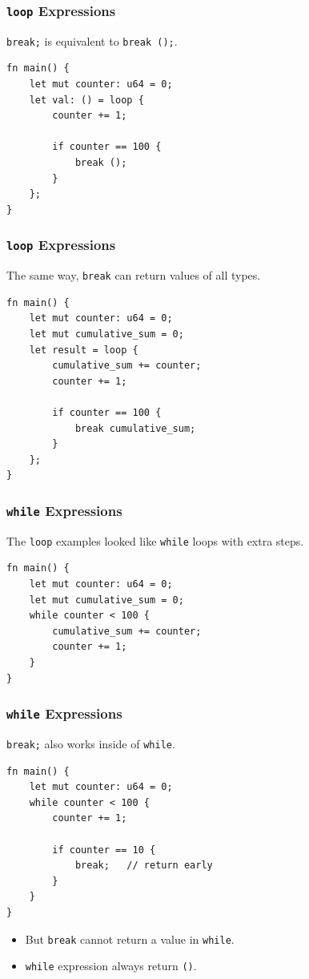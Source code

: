 \begin{frame}[fragile]
    \frametitle{\texttt{loop} Expressions}
    \texttt{break;} is equivalent to \texttt{break ();}.
    \pause
    \vfill
    \begin{verbatim}
fn main() {
    let mut counter: u64 = 0;
    let val: () = loop {
        counter += 1;

        if counter == 100 {
            break ();
        }
    };
}
    \end{verbatim}
\end{frame}

\begin{frame}[fragile]
    \frametitle{\texttt{loop} Expressions}
    The same way, \texttt{break} can return values of all types.
    \pause
    \vfill
    \begin{verbatim}
fn main() {
    let mut counter: u64 = 0;
    let mut cumulative_sum = 0;
    let result = loop {
        cumulative_sum += counter;
        counter += 1;

        if counter == 100 {
            break cumulative_sum;
        }
    };
}
    \end{verbatim}
\end{frame}

\begin{frame}[fragile]
    \frametitle{\texttt{while} Expressions}
    The \texttt{loop} examples looked like \texttt{while} loops with extra steps.
    \pause
    \vfill
    \begin{verbatim}
fn main() {
    let mut counter: u64 = 0;
    let mut cumulative_sum = 0;
    while counter < 100 {
        cumulative_sum += counter;
        counter += 1;
    }
}
    \end{verbatim}
\end{frame}

\begin{frame}[fragile]
    \frametitle{\texttt{while} Expressions}
    \texttt{break;} also works inside of \texttt{while}.
    \pause
    \vfill
    \begin{verbatim}
fn main() {
    let mut counter: u64 = 0;
    while counter < 100 {
        counter += 1;

        if counter == 10 {
            break;   // return early
        }
    }
}
    \end{verbatim}
    \pause
    \vfill
    \begin{itemize}
        \item But \texttt{break} cannot return a value in \texttt{while}.
        \item \texttt{while} expression always return \texttt{()}.
    \end{itemize}
\end{frame}

